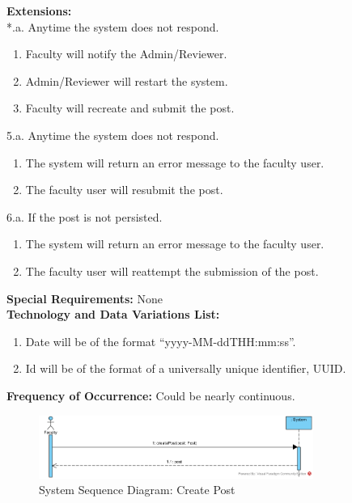 \textbf{Extensions:} \\\relax
*.a. Anytime the system does not respond.
\begin{enumerate}
    \item Faculty will notify the Admin/Reviewer.
    \item Admin/Reviewer will restart the system.
    \item Faculty will recreate and submit the post.
\end{enumerate}
5.a. Anytime the system does not respond.
\begin{enumerate}
    \item The system will return an error message to the faculty user.
    \item The faculty user will resubmit the post.
\end{enumerate}
6.a. If the post is not persisted.
\begin{enumerate}
    \item The system will return an error message to the faculty user.
    \item The faculty user will reattempt the submission of the post.
\end{enumerate}
\textbf{Special Requirements:} None \\
\textbf{Technology and Data Variations List: }
\begin{enumerate}
    \item Date will be of the format “yyyy-MM-ddTHH:mm:ss”.
    \item Id will be of the format of a universally unique identifier, UUID.
\end{enumerate}
\textbf{Frequency of Occurrence:} Could be nearly continuous. \\

\begin{figure}[H]
    \centering
    \includegraphics[width=0.8\textwidth]{images/SSD-UC10-CreatePost.png}
    \centering
    \caption{System Sequence Diagram: Create Post}
\end{figure}


